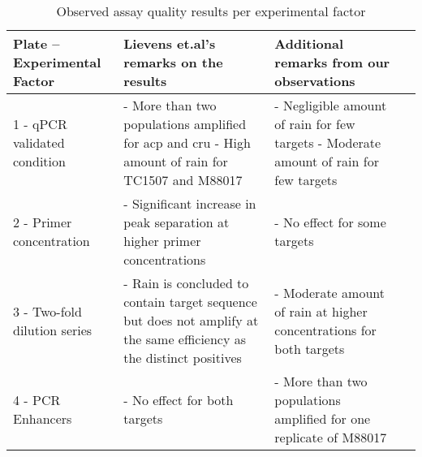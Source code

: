 \begin{table}
    \small	
    \caption{Observed assay quality results per experimental factor}    
    \begin{tabularx}{\textwidth}{p{2.7cm}*{3}{X}}
        \toprule
        \textbf{Plate – \newline Experimental Factor}       & \textbf{Lievens et.al’s remarks on the results}                                                                                                                                                                             & \textbf{Additional remarks from our   observations}                                                                                                                                                \\ 
        \midrule
        \arrayrulecolor[rgb]{0.753,0.753,0.753}
        1 - qPCR validated condition     & - More than two populations  amplified  for acp and cru \newline - High amount of rain for TC1507  and M88017                                                                      & - Negligible amount of rain for few   targets \newline - Moderate amount of rain for few targets \\
        \hline
        2 - Primer concentration         & - Significant increase in peak   separation at higher primer concentrations                                                                                                                                                 & - No effect for some targets                                                                                                                                                                       \\
        \hline
        3 - Two-fold dilution series     & - Rain is concluded to contain   target sequence but does not amplify at the same efficiency as the distinct   positives                                                                                                    & - Moderate amount of rain at higher   concentrations for both targets                                                                                                                              \\
        \hline
        4 - PCR Enhancers                                                                  & - No effect for both targets                                                                                                                                                                                                & - More than two populations amplified for   one replicate of M88017                                                                                                                                \\

\end{tabularx}
\end{table}

